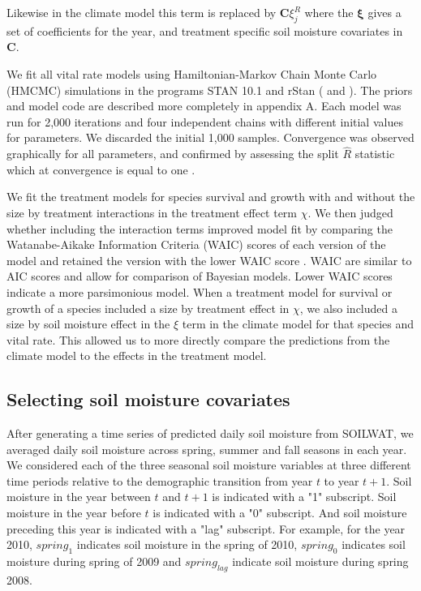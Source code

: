 \documentclass[11pt]{article}
\begin{document}
\begin{doublespacing}
Likewise in the climate model this term is replaced by $\boldsymbol{C}\xi_{j}^R$ where the $\boldsymbol{\xi}$ gives a set of coefficients for the year, and treatment specific soil moisture covariates in $\boldsymbol{C}$.

We fit all vital rate models using Hamiltonian-Markov Chain Monte Carlo (HMCMC) simulations in the programs STAN 10.1 and rStan (\citep{stan} and  \citep{rstan}). The priors and model code are described more completely in appendix A. Each model was run for 2,000 iterations and four independent chains with different initial values for parameters. We discarded the initial 1,000 samples. Convergence was observed graphically for all parameters, and confirmed by assessing the split $\widehat{R}$ statistic which at convergence is equal to one \citep{stan_manual}. 

We fit the treatment models for species survival and growth with and without the size by treatment interactions in the treatment effect term $\chi$. We then judged whether including the interaction terms improved model fit by comparing the Watanabe-Aikake Information Criteria (WAIC) scores of each version of the model and retained the version with the lower WAIC score \citep{vetari_practical_2015}. WAIC are similar to AIC scores and allow for comparison of Bayesian models. Lower WAIC scores indicate a more parsimonious model. When a treatment model for survival or growth of a species included a size by treatment effect in $\chi$, we also included a size by soil moisture effect in the $\xi$ term in the climate model for that species and vital rate. This allowed us to more directly compare the predictions from the climate model to the effects in the treatment model.

\subsection*{Selecting soil moisture covariates}

After generating a time series of predicted daily soil moisture from SOILWAT, we averaged daily soil moisture across spring, summer and fall seasons in each year. We considered each of the three seasonal soil moisture variables at three different time periods relative to the demographic transition from year $t$ to year $t+1$.  Soil moisture in the year between $t$ and $t+1$ is indicated with a "1" subscript.  Soil moisture in the year before $t$ is indicated with a "0" subscript. And soil moisture preceding this year is indicated with a "lag" subscript. For example, for the year 2010, $spring_1$ indicates soil moisture in the spring of 2010, $spring_0$ indicates soil moisture during spring of 2009 and $spring_{lag}$ indicate soil moisture during spring 2008.   


\end{doublespacing}
\end{document}
